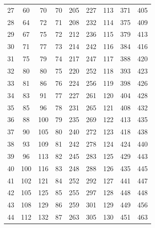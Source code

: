 \documentclass[11pt, letterpaper]{article}
\theoremstyle{definition}
\theoremstyle{remark}
\begin{document}
\begin{table}[H]
\begin{tabular}{ccc|ccc|ccc}
27 & 60 & 70 & 70 & 205 & 227 & 113 & 371 & 405 \\
28 & 64 & 72 & 71 & 208 & 232 & 114 & 375 & 409 \\
29 & 67 & 75 & 72 & 212 & 236 & 115 & 379 & 413 \\
30 & 71 & 77 & 73 & 214 & 242 & 116 & 384 & 416 \\
31 & 75 & 79 & 74 & 217 & 247 & 117 & 388 & 420 \\
32 & 80 & 80 & 75 & 220 & 252 & 118 & 393 & 423 \\
33 & 81 & 86 & 76 & 224 & 256 & 119 & 398 & 426 \\
34 & 83 & 91 & 77 & 227 & 261 & 120 & 404 & 428 \\
35 & 85 & 96 & 78 & 231 & 265 & 121 & 408 & 432 \\
36 & 88 & 100 & 79 & 235 & 269 & 122 & 413 & 435 \\
37 & 90 & 105 & 80 & 240 & 272 & 123 & 418 & 438 \\
38 & 93 & 109 & 81 & 242 & 278 & 124 & 424 & 440 \\
39 & 96 & 113 & 82 & 245 & 283 & 125 & 429 & 443 \\
40 & 100 & 116 & 83 & 248 & 288 & 126 & 435 & 445 \\
41 & 102 & 121 & 84 & 252 & 292 & 127 & 441 & 447 \\
42 & 105 & 125 & 85 & 255 & 297 & 128 & 448 & 448 \\
43 & 108 & 129 & 86 & 259 & 301 & 129 & 449 & 456 \\
44 & 112 & 132 & 87 & 263 & 305 & 130 & 451 & 463 \\
\bottomrule
\end{tabular}
\end{table}


\nocite{*}

\end{document}
